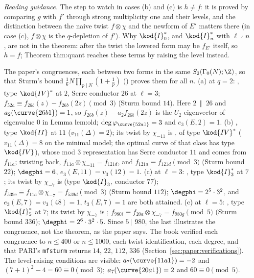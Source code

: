 \begin{sloppypar}
\noindent\emph{Reading guidance.} The step to watch in cases (b) and (c) is $h\ne f$: it is proved by comparing $g$ with $f'$ through strong multiplicity one and their
levels, and the distinction between the naive twist $f\otimes\chi$ and the newform of $E'$ matters there (in case (c), $f\otimes\chi$ is the $q$-depletion of $f'$). Why $\kod{I}_0^*$, and $\kod{I}_n^*$ with $\ell\nmid n$, are not in the
theorem: after the twist the lowered form may be $f_{E'}$ itself, so $h=f$; Theorem thm:quant reaches these terms by raising the level instead.

\begin{example}\label{ex:paper:qual}
The paper's congruences, each between two forms in the same $S_2(\Gamma_0(N);\Z)$, so that Sturm's bound $\frac16N\prod_{p\mid N}(1+\frac1p)$ \cite{Sturm87} () proves them
for all $n$. (a) at $q=2$: , type $\kod{IV}^*$ at $2$, Serre conductor $26$ at $\ell=3$; $f_{52a}\equiv f_{26b}(z)-f_{26b}(2z)\pmod3$ (Sturm bound $14$). Here $2\,\|\,26$ and $a_2(\curve{26b1})=1$, so
$f_{26b}(z)-a_2f_{26b}(2z)$ is the $U_2$-eigenvector of eigenvalue $0$ in Lemma lem:old; $\deg\varphi_{\curve{52a1}}=3$ and $e_3(E,2)=1$. (b) , type $\kod{II}$ at $11$ ($v_{11}(\Delta)=2$); its twist
by $\chi_{-11}$ is , of type $\kod{IV}^*$ ($v_{11}(\Delta)=8$ on the minimal model; the optimal curve  of that class has type $\kod{IV}$), whose mod $3$ representation has
Serre conductor $11$ and comes from $f_{11a}$; twisting back, $f_{11a}\otimes\chi_{-11}=f_{121d}$, and $f_{121a}\equiv f_{121d}\pmod3$ (Sturm bound $22$); $\degphi=6$, $e_3(E,11)=v_3(12)=1$. (c) at $\ell=3$:
, type $\kod{I}_3^*$ at $7$; its twist by $\chi_{-7}$ is  (type $\kod{I}_3$, conductor $77$); $f_{539c}\equiv f_{11a}\otimes\chi_{-7}=f_{539d}\pmod3$ (Sturm bound $112$); $\degphi=2^5\cdot3^2$,
and $e_3(E,7)=v_3(48)=1$, $t_3(E,7)=1$ are both attained. (c) at $\ell=5$: , type $\kod{I}_5^*$ at $7$; its twist by $\chi_{-7}$ is ; $f_{980i}\equiv f_{20a}\otimes\chi_{-7}=f_{980g}\pmod5$
(Sturm bound $336$); $\degphi=2^6\cdot3^2\cdot5$. Since $5\mid980$, the last illustrates the congruence, not the theorem, as the paper says. The book verified each congruence to
$n\le400$ or $n\le1000$, each twist identification, each degree, and that PARI's \texttt{mfsturm} returns $14$, $22$, $112$, $336$ (Section~\ref{sec:paper:verifications}). The level-raising
conditions are visible: $a_7(\curve{11a1})=-2$ and $(7+1)^2-4=60\equiv0\pmod3$; $a_7(\curve{20a1})=2$ and $60\equiv0\pmod5$.
\end{example}


\end{sloppypar}
